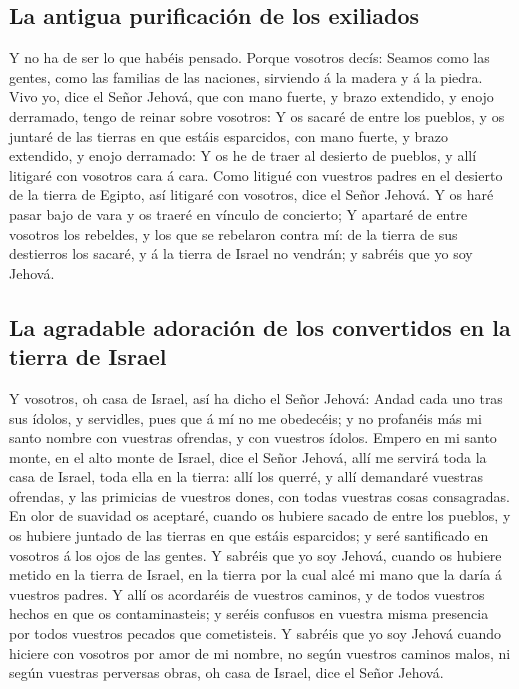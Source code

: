 \hypertarget{la-antigua-purificaciuxf3n-de-los-exiliados}{%
\subsection{La antigua purificación de los
exiliados}\label{la-antigua-purificaciuxf3n-de-los-exiliados}}

 Y no ha de ser lo que habéis pensado. Porque vosotros
decís: Seamos como las gentes, como las familias de las naciones,
sirviendo á la madera y á la piedra.  Vivo yo, dice el
Señor Jehová, que con mano fuerte, y brazo extendido, y enojo derramado,
tengo de reinar sobre vosotros:  Y os sacaré de entre los
pueblos, y os juntaré de las tierras en que estáis esparcidos, con mano
fuerte, y brazo extendido, y enojo derramado:  Y os he de
traer al desierto de pueblos, y allí litigaré con vosotros cara á cara.
 Como litigué con vuestros padres en el desierto de la
tierra de Egipto, así litigaré con vosotros, dice el Señor Jehová.
 Y os haré pasar bajo de vara y os traeré en vínculo de
concierto;  Y apartaré de entre vosotros los rebeldes, y
los que se rebelaron contra mí: de la tierra de sus destierros los
sacaré, y á la tierra de Israel no vendrán; y sabréis que yo soy Jehová.

\hypertarget{la-agradable-adoraciuxf3n-de-los-convertidos-en-la-tierra-de-israel}{%
\subsection{La agradable adoración de los convertidos en la tierra de
Israel}\label{la-agradable-adoraciuxf3n-de-los-convertidos-en-la-tierra-de-israel}}

 Y vosotros, oh casa de Israel, así ha dicho el Señor
Jehová: Andad cada uno tras sus ídolos, y servidles, pues que á mí no me
obedecéis; y no profanéis más mi santo nombre con vuestras ofrendas, y
con vuestros ídolos.  Empero en mi santo monte, en el
alto monte de Israel, dice el Señor Jehová, allí me servirá toda la casa
de Israel, toda ella en la tierra: allí los querré, y allí demandaré
vuestras ofrendas, y las primicias de vuestros dones, con todas vuestras
cosas consagradas.  En olor de suavidad os aceptaré,
cuando os hubiere sacado de entre los pueblos, y os hubiere juntado de
las tierras en que estáis esparcidos; y seré santificado en vosotros á
los ojos de las gentes.  Y sabréis que yo soy Jehová,
cuando os hubiere metido en la tierra de Israel, en la tierra por la
cual alcé mi mano que la daría á vuestros padres.  Y allí
os acordaréis de vuestros caminos, y de todos vuestros hechos en que os
contaminasteis; y seréis confusos en vuestra misma presencia por todos
vuestros pecados que cometisteis.  Y sabréis que yo soy
Jehová cuando hiciere con vosotros por amor de mi nombre, no según
vuestros caminos malos, ni según vuestras perversas obras, oh casa de
Israel, dice el Señor Jehová.

